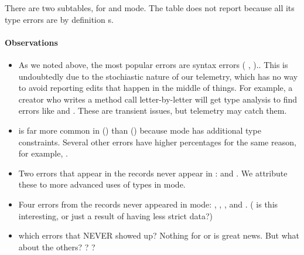 \documentclass[english,submission,cleveref]{programming}
\begin{document}
There are two subtables, for \mnonstrict{} and \mstrict{} mode.
The table does not report \mnocheck{} because all its type errors are
by definition s.

\paragraph{Observations}

\begin{itemize}
  \item
    As we noted above, the most popular errors are syntax errors
    (\FILL{}  \mnonstrict{},  \mstrict{})..
    This is undoubtedly due to the stochiastic nature
    of our telemetry, which has no way to avoid
    reporting edits that happen in the middle of things.
    For example, a creator who writes a method call
     letter-by-letter will
    get type analysis to find errors like 
    and .
    These are transient issues, but telemetry may catch them.

  \item
     is far more common in \mstrict{} ()
    than \mnonstrict{} () because \mstrict{} mode
    has additional type constraints.
    Several other errors have higher \mstrict{} percentages for the
    same reason, for example, .

  \item
    Two errors that appear in the \mstrict{} records
    never appear in \mnonstrict{}:  and .
    We attribute these to more advanced uses of types in \mstrict{} mode.

  \item
    Four errors from the \mnonstrict{} records never appeared in \mstrict{} mode:
    , ,
    , and .
    (\QALAN{} is this interesting, or just a result of having less strict data?)

  \item
    \FILL{} which errors that NEVER showed up?
    Nothing for  or  is great news.
    But what about the others?
    ?
    ?

\end{itemize}
\end{document}
